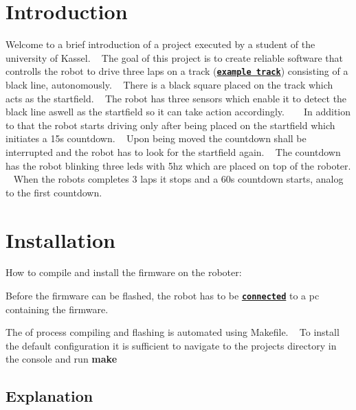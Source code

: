   \hypertarget{index_intro_sec}{}\section{Introduction}\label{index_intro_sec}
Welcome to a brief introduction of a project executed by a student of the university of Kassel. ~\newline
 The goal of this project is to create reliable software that controlls the robot to drive three laps on a track (\href{track_img.jpg}{\tt {\bfseries example track}}) consisting of a black line, autonomously. ~\newline
There is a black square placed on the track which acts as the startfield. ~\newline
 The robot has three sensors which enable it to detect the black line aswell as the startfield so it can take action accordingly. ~\newline
~\newline
In addition to that the robot starts driving only after being placed on the startfield which initiates a 15s countdown. ~\newline
Upon being moved the countdown shall be interrupted and the robot has to look for the startfield again. ~\newline
 The countdown has the robot blinking three leds with 5hz which are placed on top of the roboter. ~\newline
When the robots completes 3 laps it stops and a 60s countdown starts, analog to the first countdown.\hypertarget{index_install_sec}{}\section{Installation}\label{index_install_sec}
How to compile and install the firmware on the roboter\+:
\begin{DoxyItemize}
\item Before the firmware can be flashed, the robot has to be \href{flashing_process.jpg}{\tt {\bfseries connected}} to a pc containing the firmware.
\item The of process compiling and flashing is automated using Makefile. ~\newline
 To install the default configuration it is sufficient to navigate to the projects directory in the console and run {\bfseries make}
\end{DoxyItemize}\hypertarget{index_Explanation}{}\subsection{Explanation}\label{index_Explanation}

